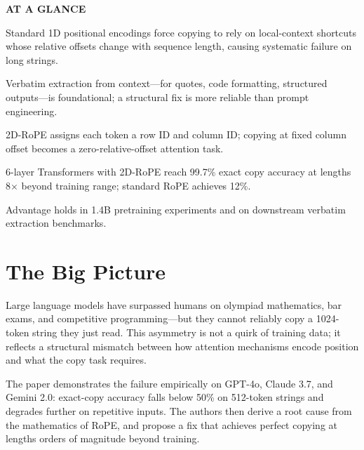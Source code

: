 \documentclass[10pt,twocolumn]{article}
\begin{document}
\begin{mdframed}[backgroundcolor=boxgray,linecolor=rulered,linewidth=1pt,
    innerleftmargin=6pt,innerrightmargin=6pt,
    innertopmargin=6pt,innerbottommargin=6pt]
\textbf{\small AT A GLANCE}\par\vspace{4pt}
\begin{description}[leftmargin=0pt,labelsep=4pt,itemsep=2pt,parsep=0pt,
    font=\small\bfseries]
  \item[Problem:] Standard 1D positional encodings force copying to
    rely on local-context shortcuts whose relative offsets change with
    sequence length, causing systematic failure on long strings.
  \item[Why it matters:] Verbatim extraction from context---for
    quotes, code formatting, structured outputs---is foundational; a
    structural fix is more reliable than prompt engineering.
  \item[Method:] 2D-RoPE assigns each token a row ID and column ID;
    copying at fixed column offset becomes a zero-relative-offset
    attention task.
  \item[Result:] 6-layer Transformers with 2D-RoPE reach 99.7\%
    exact copy accuracy at lengths 8$\times$ beyond training range;
    standard RoPE achieves 12\%.
  \item[Evidence:] Advantage holds in 1.4B pretraining experiments
    and on downstream verbatim extraction benchmarks.
\end{description}
\end{mdframed}

\section{The Big Picture}

Large language models have surpassed humans on olympiad mathematics,
bar exams, and competitive programming---but they cannot reliably copy
a 1024-token string they just read. This asymmetry is not a quirk of
training data; it reflects a structural mismatch between how attention
mechanisms encode position and what the copy task requires.

The paper demonstrates the failure empirically on GPT-4o, Claude 3.7,
and Gemini 2.0: exact-copy accuracy falls below 50\% on 512-token
strings and degrades further on repetitive inputs. The authors then
derive a root cause from the mathematics of RoPE, and propose a fix
that achieves perfect copying at lengths orders of magnitude beyond
training.
\end{document}
